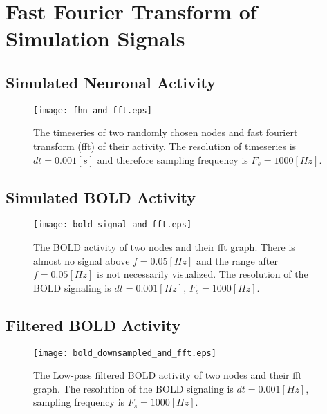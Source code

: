 \documentclass[12pt]{article}
\begin{document}
\newpage

\section{Fast Fourier Transform of Simulation Signals}

\subsection{Simulated Neuronal Activity}

\begin{figure}[htp!]
  \centering
  \texttt{[image: fhn\_and\_fft.eps]}   


	\label{figur}\caption{The timeseries of two randomly chosen nodes and fast fouriert transform (fft) of their activity. The resolution of timeseries is $dt=0.001[s]$ and therefore sampling frequency is $F_s=1000[Hz]$.}
	
\end{figure}



\subsection{Simulated BOLD Activity}

\begin{figure}[htp!]
  \centering
  \texttt{[image: bold\_signal\_and\_fft.eps]}   


	\label{figur}\caption{The BOLD activity of two nodes and their fft graph. There is almost no signal above $f=0.05[Hz]$ and the range after $f=0.05[Hz]$ is not necessarily visualized. The resolution of the BOLD signaling is $dt=0.001[Hz]$, $F_s=1000[Hz]$.}
	
\end{figure}


\subsection{Filtered BOLD Activity}

\begin{figure}[htp!]
  \centering
  \texttt{[image: bold\_downsampled\_and\_fft.eps]}   


	\label{figur}\caption{The Low-pass filtered BOLD activity of two nodes and their fft graph. The resolution of the BOLD signaling is $dt=0.001[Hz]$, sampling frequency is $F_s=1000[Hz]$.}
	
\end{figure}
\end{document}
